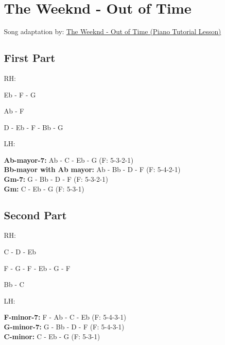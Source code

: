
\section{The Weeknd - Out of Time}

Song adaptation by: \href{https://www.youtube.com/watch?v=oQjiX_uuxE0}{ The Weeknd - Out of Time (Piano Tutorial Lesson) }

\subsection{First Part}

RH: 

Eb - F - G 

Ab - F

D - Eb - F - Bb - G

LH:

\textbf{Ab-mayor-7:} Ab - C - Eb - G (F: 5-3-2-1)\\
\textbf{Bb-mayor with Ab mayor:} Ab - Bb - D - F (F: 5-4-2-1)\\
\textbf{Gm-7:} G - Bb - D - F (F: 5-3-2-1)\\
\textbf{Gm:} C - Eb - G (F: 5-3-1)

\subsection{Second Part}

RH:

C - D - Eb

F - G - F - Eb - G - F

Bb - C

LH:

\textbf{F-minor-7:} F - Ab - C - Eb (F: 5-4-3-1)\\
\textbf{G-minor-7:} G - Bb - D - F (F: 5-4-3-1)\\
\textbf{C-minor:} C - Eb - G (F: 5-3-1)

